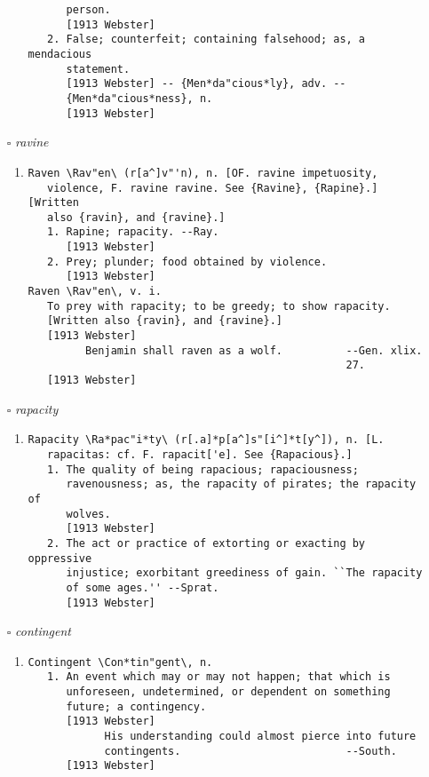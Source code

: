 \documentclass{article}
\begin{document}
\begin{itemize}
\begin{enumerate}
{\begin{lstlisting}
      person.
      [1913 Webster]
   2. False; counterfeit; containing falsehood; as, a mendacious
      statement.
      [1913 Webster] -- {Men*da"cious*ly}, adv. --
      {Men*da"cious*ness}, n.
      [1913 Webster]
\end{lstlisting}}
\end{enumerate}
\item[$\square$] \emph{ ravine }
\begin{enumerate}
\item{
\begin{lstlisting}
Raven \Rav"en\ (r[a^]v"'n), n. [OF. ravine impetuosity,
   violence, F. ravine ravine. See {Ravine}, {Rapine}.] [Written
   also {ravin}, and {ravine}.]
   1. Rapine; rapacity. --Ray.
      [1913 Webster]
   2. Prey; plunder; food obtained by violence.
      [1913 Webster]
Raven \Rav"en\, v. i.
   To prey with rapacity; to be greedy; to show rapacity.
   [Written also {ravin}, and {ravine}.]
   [1913 Webster]
         Benjamin shall raven as a wolf.          --Gen. xlix.
                                                  27.
   [1913 Webster]
\end{lstlisting}}
\end{enumerate}
\item[$\square$] \emph{ rapacity }
\begin{enumerate}
\item{
\begin{lstlisting}
Rapacity \Ra*pac"i*ty\ (r[.a]*p[a^]s"[i^]*t[y^]), n. [L.
   rapacitas: cf. F. rapacit['e]. See {Rapacious}.]
   1. The quality of being rapacious; rapaciousness;
      ravenousness; as, the rapacity of pirates; the rapacity of
      wolves.
      [1913 Webster]
   2. The act or practice of extorting or exacting by oppressive
      injustice; exorbitant greediness of gain. ``The rapacity
      of some ages.'' --Sprat.
      [1913 Webster]
\end{lstlisting}}
\end{enumerate}
\item[$\square$] \emph{ contingent }
\begin{enumerate}
\item{
\begin{lstlisting}
Contingent \Con*tin"gent\, n.
   1. An event which may or may not happen; that which is
      unforeseen, undetermined, or dependent on something
      future; a contingency.
      [1913 Webster]
            His understanding could almost pierce into future
            contingents.                          --South.
      [1913 Webster]

\end{lstlisting}}
\end{enumerate}
\end{itemize}
\end{document}
